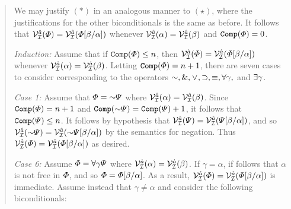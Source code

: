 \begin{quote}
  We may justify $(\ast)$ in an analogous manner to $(\star)$, where the justifications for the other biconditionals is the same as before. 
  It follows that $\mathcal{V}_{\mathcal{I}}^{\hat{a}}(\varPhi)=\mathcal{V}_{\mathcal{I}}^{\hat{a}}(\varPhi[\beta/\alpha])$ whenever $\mathcal{V}_{\mathcal{I}}^{\hat{a}}(\alpha)=\mathcal{V}_{\mathcal{I}}^{\hat{a}}(\beta)$ and $\texttt{Comp}(\varPhi)=0$. 

  \textit{Induction:} Assume that if $\texttt{Comp}(\varPhi)\leq n$, then $\mathcal{V}_{\mathcal{I}}^{\hat{a}}(\varPhi)=\mathcal{V}_{\mathcal{I}}^{\hat{a}}(\varPhi[\beta/\alpha])$ whenever $\mathcal{V}_{\mathcal{I}}^{\hat{a}}(\alpha)=\mathcal{V}_{\mathcal{I}}^{\hat{a}}(\beta)$. 
  Letting $\texttt{Comp}(\varPhi)=n+1$, there are seven cases to consider corresponding to the operators $\enot,\eand,\eor,\eif,\eiff,\qt{\forall}{\gamma},$ and $\exists \gamma$.

  \textit{Case 1:} Assume that $\metaA=\enot\metaB$ where $\mathcal{V}_{\mathcal{I}}^{\hat{a}}(\alpha)=\mathcal{V}_{\mathcal{I}}^{\hat{a}}(\beta)$.
  Since $\texttt{Comp}(\varPhi)=n+1$ and $\comp(\enot\metaB)=\comp(\metaB)+1$, it follows that $\texttt{Comp}(\varPsi)\leq n$.
  It follows by hypothesis that $\mathcal{V}_{\mathcal{I}}^{\hat{a}}(\varPsi)=\mathcal{V}_{\mathcal{I}}^{\hat{a}}(\varPsi[\beta/\alpha])$, and so $\VV{\I}{\va{a}}(\enot\metaB)=\VV{\I}{\va{a}}(\enot\metaB\unisub{\beta}{\alpha})$ by the semantics for negation.
  Thus $\mathcal{V}_{\mathcal{I}}^{\hat{a}}(\varPhi)=\mathcal{V}_{\mathcal{I}}^{\hat{a}}(\varPhi[\beta/\alpha])$ as desired. 


  \textit{Case 6:} Assume $\varPhi=\forall \gamma\varPsi$ where $\mathcal{V}_{\mathcal{I}}^{\hat{a}}(\alpha)=\mathcal{V}_{\mathcal{I}}^{\hat{a}}(\beta)$.
  If $\gamma=\alpha$, if follows that $\alpha$ is not free in $\varPhi$, and so $\varPhi=\varPhi[\beta/\alpha]$.
  As a result, $\mathcal{V}_{\mathcal{I}}^{\hat{a}}(\varPhi)=\mathcal{V}_{\mathcal{I}}^{\hat{a}}(\varPhi[\beta/\alpha])$ is immediate.
  Assume instead that $\gamma\neq\alpha$ and consider the following biconditionals:


\end{quote}
